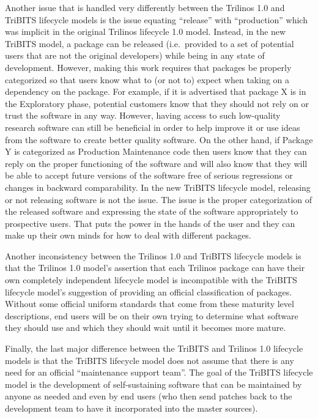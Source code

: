 \documentclass[11pt]{SANDreport}
\begin{document}
Another issue that is handled very differently between the Trilinos
1.0 and TriBITS lifecycle models is the issue equating ``release''
with ``production'' which was implicit in the original Trilinos
lifecycle 1.0 model.  Instead, in the new TriBITS model, a package can
be released (i.e.\ provided to a set of potential users that are not
the original developers) while being in any state of development.
However, making this work requires that packages be properly
categorized so that users know what to (or not to) expect when taking
on a dependency on the package.  For example, if it is advertised that
package X is in the Exploratory phase, potential customers know that
they should not rely on or trust the software in any way.  However,
having access to such low-quality research software can still be
beneficial in order to help improve it or use ideas from the software
to create better quality software.  On the other hand, if Package Y is
categorized as Production Maintenance code then users know that they
can reply on the proper functioning of the software and will also know
that they will be able to accept future versions of the software free
of serious regressions or changes in backward comparability.  In the
new TriBITS lifecycle model, releasing or not releasing software is
not the issue.  The issue is the proper categorization of the released
software and expressing the state of the software appropriately to
prospective users.  That puts the power in the hands of the user and
they can make up their own minds for how to deal with different
packages.

Another inconsistency between the Trilinos 1.0 and TriBITS lifecycle
models is that the Trilinos 1.0 model's assertion that each Trilinos
package can have their own completely independent lifecycle model is
incompatible with the TriBITS lifecycle model's suggestion of
providing an official classification of packages.  Without some
official uniform standards that come from these maturity level
descriptions, end users will be on their own trying to determine what
software they should use and which they should wait until it becomes
more mature.

Finally, the last major difference between the TriBITS and Trilinos
1.0 lifecycle models is that the TriBITS lifecycle model does not
assume that there is any need for an official ``maintenance support
team''.  The goal of the TriBITS lifecycle model is the development of
self-sustaining software that can be maintained by anyone as needed
and even by end users (who then send patches back to the development
team to have it incorporated into the master sources).
\end{document}
